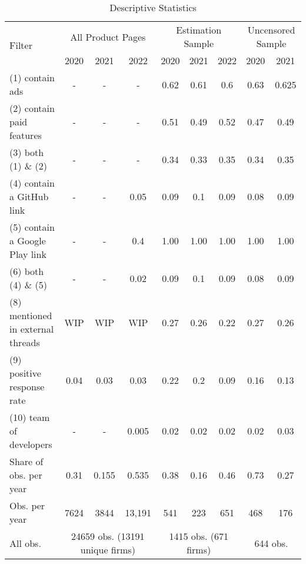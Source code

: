 \documentclass[13pt]{article}
\numberwithin{figure}{section}
\numberwithin{table}{section}
\theoremstyle{indented}
\numberwithin{equation}{section} %
\begin{document}
\begin{table}[!htbp] \centering 
\caption{Descriptive Statistics} 
  \label{table:decomp} 
    \begin{tabular}{|l|c|c|c|c|c|c|c|c|}
        \hline 
    \multirow{2}{*}{Filter}  & \multicolumn{3}{c|}{All Product Pages} & \multicolumn{3}{c|}{Estimation Sample}&\multicolumn{2}{c|}{Uncensored Sample} \\ 
        \cline{2-9} 
       & 2020 & 2021 & 2022 &2020&2021&2022&2020&2021\\ 
         \hline
    (1) contain ads  & - & - & - & 0.62 & 0.61 & 0.6& 0.63 & 0.625 \\ 

    (2) contain paid features  & - & - & - & 0.51 & 0.49 & 0.52 & 0.47 & 0.49 \\ 
    
    (3) both (1) \& (2)  & - & - & - & 0.34 & 0.33 & 0.35& 0.34 & 0.35 \\ 
    
    (4) contain a GitHub link  & - & - & 0.05 & 0.09 & 0.1 & 0.09 & 0.08 & 0.09\\ 
    
    (5) contain a Google Play link  & - & - & 0.4 & 1.00 & 1.00 & 1.00 & 1.00 & 1.00\\ 
    
    (6) both (4) \& (5)   & - & - & 0.02 & 0.09 & 0.1 & 0.09  & 0.08 & 0.09\\ 
    
    (8) mentioned in external threads  & WIP & WIP & WIP & 0.27 & 0.26 & 0.22 & 0.27 & 0.26 \\ 
    
    (9) positive response rate  & 0.04 & 0.03 & 0.03 & 0.22 & 0.2 & 0.09 & 0.16 & 0.13 \\
    
    (10) team of developers & - & - & 0.005 & 0.02 & 0.02 & 0.02 & 0.02 & 0.03\\
    
   
    \hline
    
    Share of obs. per year  & 0.31 & 0.155 & 0.535 & 0.38 & 0.16 & 0.46 & 0.73& 0.27 \\
    Obs. per year   &  7624& 3844&  13,191& 541 & 223 & 651 & 468 & 176 \\
        \hline 
    All obs.& \multicolumn{3}{c|}{ 24659 obs. (13191 unique firms)} & \multicolumn{3}{c|}{1415 obs. (671 firms)}&\multicolumn{2}{c|}{644 obs.} \\
    \hline
    \end{tabular} 
    \end{table} 
 
\end{document}
